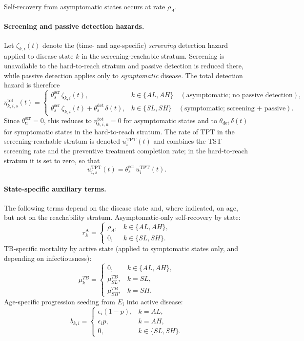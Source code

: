 \documentclass[11pt]{article}
\begin{document}
Self-recovery from asymptomatic states occurs at rate \(\rho_{A}\).

\paragraph{Screening and passive detection hazards.}
Let \(\zeta_{k,i}(t)\) denote the (time- and age-specific) \emph{screening} detection hazard applied to disease state \(k\) in the screening-reachable stratum. Screening is unavailable to the hard-to-reach stratum and passive detection is reduced there, while passive detection applies only to \emph{symptomatic} disease. The total detection hazard is therefore
\[
\eta_{k,i,s}^{\text{tot}}(t) =
\begin{cases}
\theta^{\mathrm{scr}}_s\,\zeta_{k,i}(t), & k\in\{AL,AH\}\quad(\text{asymptomatic; no passive detection}),\\[4pt]
\theta^{\mathrm{scr}}_s\,\zeta_{k,i}(t) + \theta^{\mathrm{det}}_s\,\delta(t), & k\in\{SL,SH\}\quad(\text{symptomatic; screening + passive}).
\end{cases}
\]
Since \(\theta^{\mathrm{scr}}_{\mathrm{u}}=0\), this reduces to \(\eta^{\mathrm{tot}}_{k,i,\mathrm{u}}=0\) for asymptomatic states and to \(\theta_{\mathrm{det}}\,\delta(t)\) for symptomatic states in the hard-to-reach stratum.
The rate of TPT in the screening-reachable stratum is denoted \(u^{\mathrm{TPT}}_i(t)\) and combines the TST screening rate and the preventive treatment completion rate; in the hard-to-reach stratum it is set to zero, so that
\[
u^{\mathrm{TPT}}_{i,s}(t) = \theta^{\mathrm{scr}}_s\, u^{\mathrm{TPT}}_i(t).
\]

\paragraph{State-specific auxiliary terms.}
The following terms depend on the disease state and, where indicated, on age, but not on the reachability stratum.
Asymptomatic-only self-recovery by state:
\[
r^{\mathrm{A}}_k =
\begin{cases}
\rho_{A}, & k\in\{AL,AH\},\\
0, & k\in\{SL,SH\}.
\end{cases}
\]
TB-specific mortality by active state (applied to symptomatic states only, and depending on infectiousness):
\[
\mu^{TB}_{k} =
\begin{cases}
0, & k\in\{AL,AH\},\\
\mu^{TB}_{SL}, & k=SL,\\
\mu^{TB}_{SH}, & k=SH.
\end{cases}
\]
Age-specific progression seeding from \(E_i\) into active disease:
\[
b_{k,i} =
\begin{cases}
\epsilon_i(1-p), & k=AL,\\
\epsilon_i p, & k=AH,\\
0, & k\in\{SL,SH\}.
\end{cases}
\]
\end{document}
